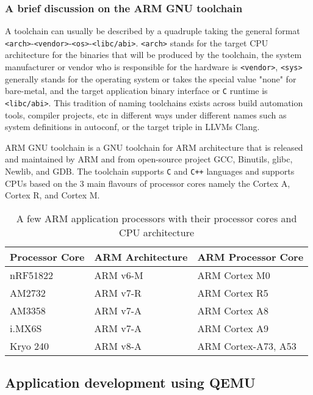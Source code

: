 \subsubsection{A brief discussion on the ARM GNU toolchain}

A toolchain can usually be described by a quadruple taking the general format \texttt{<arch>}-\texttt{<vendor>}-\texttt{<os>}-\texttt{<libc/abi>}. \texttt{<arch>} stands for the target CPU architecture for the binaries that will be produced by the toolchain, the system manufacturer or vendor who is responsible for the hardware is \texttt{<vendor>}, \texttt{<sys>} generally stands for the operating system or takes the special value "none" for bare-metal, and the target application binary interface or \texttt{C} runtime is \texttt{<libc/abi>}. This tradition of naming toolchains exists across build automation tools, compiler projects, etc in different ways under different names such as system definitions in autoconf, or the target triple in LLVM\textquotesingle s Clang.

ARM GNU toolchain is a GNU toolchain for ARM architecture that is released and maintained by ARM and from open-source project GCC, Binutils, glibc, Newlib, and GDB. The toolchain supports \texttt{C} and \texttt{C++} languages and supports CPUs based on the 3 main flavours of processor cores namely the Cortex A, Cortex R, and Cortex M.

\begin{table}[h]
	\centering
	\begin{tabular}{ |p{7em}|p{9em}|p{12em}| }
		\hline
			\textbf{Processor Core} & \textbf{ARM Architecture} & \textbf{ARM Processor Core} \\
		\hline
			nRF51822 & ARM v6-M & ARM Cortex M0 \\
		\hline
			AM2732 & ARM v7-R & ARM Cortex R5 \\
		\hline
			AM3358 & ARM v7-A & ARM Cortex A8 \\
		\hline
			i.MX6S & ARM v7-A & ARM Cortex A9 \\
		\hline
			Kryo 240 & ARM v8-A & ARM Cortex-A73, A53 \\
		\hline
	\end{tabular}
	\caption{A few ARM application processors with their processor cores and CPU architecture}
	\label{table:arm}
\end{table}


\subsection{Application development using QEMU}

